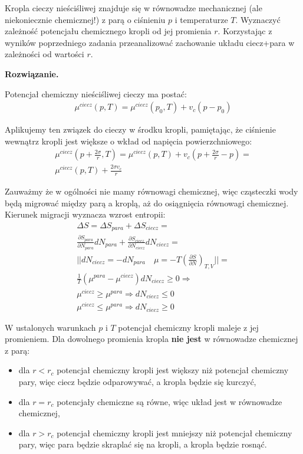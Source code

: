 \documentclass[11pt,a4paper]{article}
\newenvironment{solution}{\vspace{1cm} \par\textbf{Rozwiązanie.} \vspace{1cm}}{}
\begin{document}
Kropla cieczy nieściśliwej znajduje się w równowadze mechanicznej (ale niekoniecznie chemicznej!) z parą o ciśnieniu
$p$ i temperaturze $T$. Wyznaczyć zależność potencjału chemicznego kropli od jej promienia $r$. Korzystając z wyników
poprzedniego zadania przeanalizować zachowanie układu ciecz+para w zależności od wartości $r$.

\begin{solution}

Potencjał chemiczny nieściśliwej cieczy ma postać:
\begin{align*}
  \mu^{ciecz}(p,T) = \mu^{ciecz}(p_0,T) + v_c(p - p_0)
\end{align*}

Aplikujemy ten związek do cieczy w środku kropli, pamiętając, że ciśnienie 
wewnątrz kropli jest większe o wkład od napięcia powierzchniowego:
\begin{align*}
  \mu^{ciecz}(p + \frac{2\sigma}{r},T) = \mu^{ciecz}(p,T) + 
   v_c\left(p + \frac{2\sigma}{r} - p\right) = \\
  \mu^{ciecz}(p,T) + \frac{2\sigma v_c}{r}
\end{align*}

Zauważmy że w ogólności nie mamy równowagi chemicznej, więc 
cząsteczki wody będą migrować między parą a kroplą, aż do osiągnięcia 
równowagi chemicznej. Kierunek migracji wyznacza wzrost entropii:
\begin{align*}
  \Delta S = \Delta S_{para} + \Delta S_{ciecz} = \\
   \frac{\partial S_{para}}{\partial N_{para}} dN_{para} + 
   \frac{\partial S_{ciecz}}{\partial N_{ciecz}} dN_{ciecz} = \\
   || dN_{ciecz} = -dN_{para} \quad \mu = -T \left(\frac{\partial S}{\partial N}\right)_{T,V} || = \\
   \frac{1}{T} \left( \mu^{para} - \mu^{ciecz} \right) dN_{ciecz} \geq 0 \Rightarrow \\
    \mu^{ciecz} \geq \mu^{para} \Rightarrow dN_{ciecz} \leq 0 \\
    \mu^{ciecz} \leq \mu^{para} \Rightarrow dN_{ciecz} \geq 0
\end{align*}


W ustalonych warunkach $p$ i $T$ potencjał chemiczny kropli 
maleje z jej promieniem. Dla dowolnego promienia kropla {\bf nie jest} 
w równowadze chemicznej z parą:
\begin{itemize}
  \item dla $r < r_c$ potencjał chemiczny kropli jest większy niż 
  potencjał chemiczny pary, więc ciecz będzie odparowywać, a kropla będzie się kurczyć,
  \item dla $r = r_c$ potencjały chemiczne są równe, więc układ jest w równowadze 
  chemicznej,
  \item dla $r > r_c$ potencjał chemiczny kropli jest mniejszy niż 
  potencjał chemiczny pary, więc para będzie skraplać się na kropli, 
  a kropla będzie rosnąć.
\end{itemize}


\end{solution}
\end{document}
